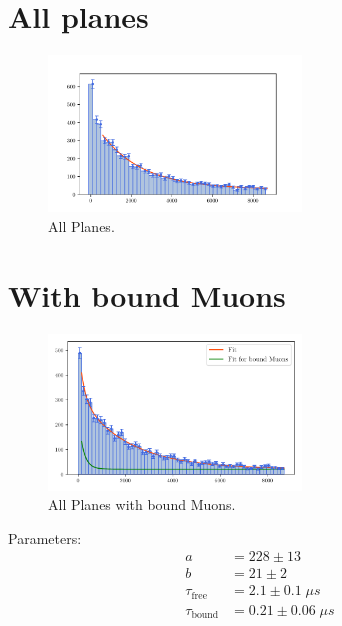 \section{All planes}
\begin{figure}
    \centering
    \includegraphics[width=0.6\textwidth]{plots/pALL.pdf}
    \caption{All Planes.}
    \label{fig:pALL}
\end{figure}

\section{With bound Muons}

\begin{figure}
    \centering
    \includegraphics[width=0.6\textwidth]{plots/ptest.pdf}
    \caption{All Planes with bound Muons.}
    \label{fig:ptest}
\end{figure}

Parameters:
\begin{align*}
    a &= 228 \pm 13 \\
    b &= 21 \pm 2 \\
    \tau_{\text{free}} &= 2.1 \pm 0.1 \; \mu s\\
    \tau_{\text{bound}} &= 0.21 \pm 0.06 \;\mu s
\end{align*}
